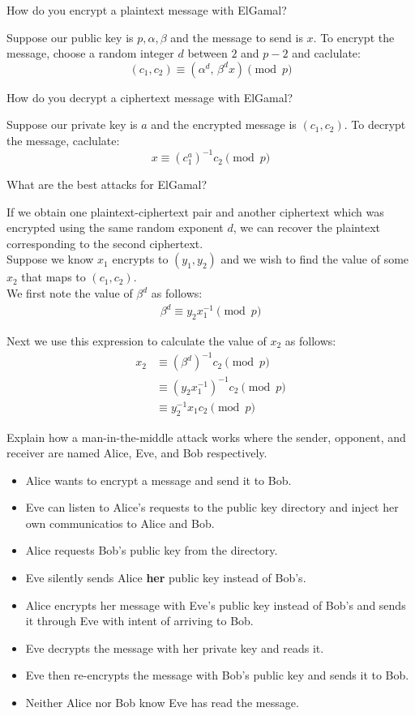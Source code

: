 \documentclass{article}
\newcounter{qcounter}
\newcommand{\showqcounter}{\theqcounter}
\newcommand{\question}{\vspace{5mm}\addtocounter{qcounter}{1}\vspace{5mm}{\bf Q\showqcounter: }}
\newcommand{\answer}{\vspace{5mm}{\bf A\showqcounter: }}
\begin{document}
\question How do you encrypt a plaintext message with ElGamal?

\answer Suppose our public key is $p, \alpha, \beta$ and the message to send is $x$. 
  To encrypt the message, choose a random integer $d$ between $2$ and $p - 2$ and caclulate:
  $$
    (c_1, c_2) \equiv \left(\alpha^d,\, \beta^d x \right) \pmod{p}
  $$


\question How do you decrypt a ciphertext message with ElGamal?

\answer Suppose our private key is $a$ and the encrypted message is $(c_1, c_2)$. To decrypt the message, caclulate:
  $$
    x \equiv (c_1^a)^{-1}c_2 \pmod{p}
  $$


\question What are the best attacks for ElGamal?

\answer If we obtain one plaintext-ciphertext pair and another ciphertext which was encrypted using the same random exponent 
  $d$, we can recover the plaintext corresponding to the second ciphertext. \\
  
  Suppose we know $x_1$ encrypts to $(y_1, y_2)$ and we wish to find the value of some $x_2$ that maps to $(c_1, c_2)$. \\
  
  We first note the value of $\beta^d$ as follows:
  \begin{align*}
    \beta^d \equiv y_2 x_1^{-1} \pmod{p}
  \end{align*}

  Next we use this expression to calculate the value of $x_2$ as follows:
  \begin{align*}
    x_2 &\equiv \left(\beta^d\right)^{-1} c_2 \pmod{p}\\
        &\equiv \left( y_2 x_1^{-1} \right)^{-1} c_2 \pmod{p}\\
        &\equiv y_2^{-1} x_1 c_2 \pmod{p}
  \end{align*}


\question Explain how a man-in-the-middle attack works where the sender, opponent, and receiver are named Alice, Eve, and Bob respectively.

\answer 
  \begin{itemize}
    \item Alice wants to encrypt a message and send it to Bob.
    \item Eve can listen to Alice's requests to the public key directory and inject her own communicatios to Alice and Bob.
    \item Alice requests Bob's public key from the directory.
    \item Eve silently sends Alice {\bf her} public key instead of Bob's.
    \item Alice encrypts her message with Eve's public key instead of Bob's and sends it through Eve with intent of arriving to Bob.
    \item Eve decrypts the message with her private key and reads it.
    \item Eve then re-encrypts the message with Bob's public key and sends it to Bob.
    \item Neither Alice nor Bob know Eve has read the message.
  \end{itemize}
\end{document}

